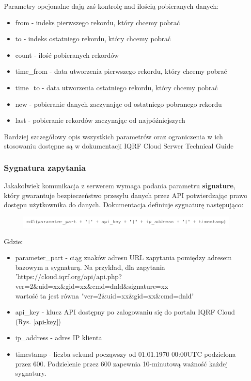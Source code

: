 Parametry opcjonalne dają zaś kontrolę nad ilością pobieranych danych:

\begin{itemize}
    \item from - indeks pierwszego rekordu, który chcemy pobrać
    \item to - indeks ostatniego rekordu, który chcemy pobrać
    \item count - ilość pobieranych rekordów
    \item time\_from - data utworzenia pierwszego rekordu, który chcemy pobrać 
    \item time\_to - data utworzenia ostatniego rekordu, który chcemy pobrać
    \item new - pobieranie danych zaczynając od ostatniego pobranego rekordu
    \item last - pobieranie rekordów zaczynając od najpóźniejszych
\end{itemize}

Bardziej szczegółowy opis wszystkich parametrów oraz ograniczenia w ich stosowaniu dostępne są w dokumentacji IQRF Cloud Serwer Technical Guide 
\cite{iqrfcloud-guide}

\subsubsection{Sygnatura zapytania}

Jakakolwiek komunikacja z serwerem wymaga podania parametru \textbf{signature}, który gwarantuje bezpieczeństwo przesyłu danych przez API 
potwierdzając prawo dostępu użytkownika do danych. Dokumentacja \cite{iqrfcloud-guide} definiuje sygnaturę następująco:

\begin{figure}[H]
    \includegraphics[width=\textwidth]{zdj/md5.png}
\end{figure}

Gdzie: 


\begin{itemize}
    \item parameter\_part - ciąg znaków adresu URL zapytania pomiędzy adresem bazowym a sygnaturą. Na przykład, dla zapytania \\
    'https://cloud.iqrf.org/api/api.php?ver=2\&uid=xx\&gid=xx\&cmd=dnld\&signature=xx \\
wartość ta jest równa "ver=2\&uid=xx\&gid=xx\&cmd=dnld'
    \item api\_key - klucz API dostępny po zalogowaniu się do portalu IQRF Cloud (Rys. \ref{api-key})
    \item ip\_address - adres IP klienta
    \item timestamp - liczba sekund począwszy od 01.01.1970 00:00UTC podzielona przez 600. Podzielenie przez 600 zapewnia 10-minutową
ważność każdej sygnatury.
\end{itemize}

